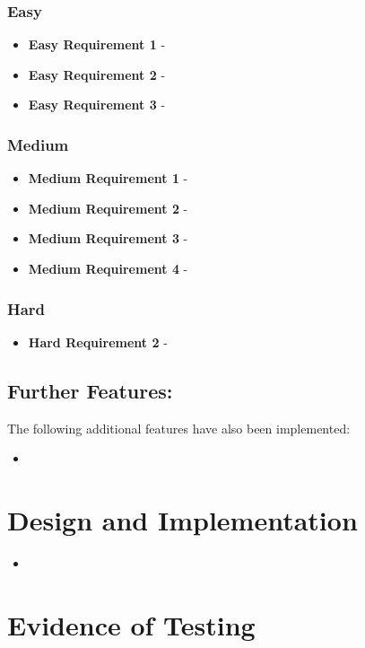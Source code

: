 \documentclass[11]{article}
\begin{document}
	 	\subsubsection{Easy}
			\begin{itemize}
				\item \textbf{Easy Requirement 1} - 
				\item \textbf{Easy Requirement 2} - 
				\item \textbf{Easy Requirement 3} - 
			\end{itemize}

		\subsubsection{Medium}
			\begin{itemize}
				\item \textbf{Medium Requirement 1} - 
				\item \textbf{Medium Requirement 2} - 
				\item \textbf{Medium Requirement 3} - 
				\item \textbf{Medium Requirement 4} -
			\end{itemize}
		\subsubsection{Hard}
				\begin{itemize}
					\item \textbf{Hard Requirement 2} - 
				\end{itemize}
	\subsection{Further Features:}
		The following additional features have also been implemented:
		\begin{itemize}
			\item 
		\end{itemize}

	\section{Design and Implementation}
		\begin{itemize}
				\item
		\end{itemize}
		
	\section{Evidence of Testing}	
		
\end{document}
